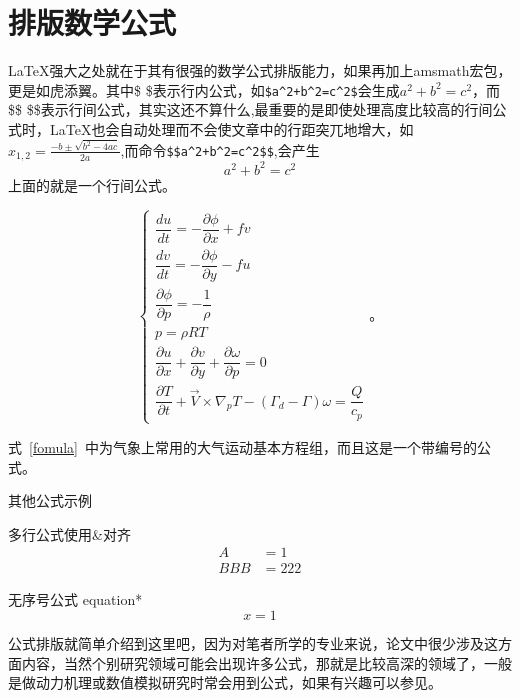 \section{排版数学公式}

\LaTeX 强大之处就在于其有很强的数学公式排版能力，如果再加上amsmath宏包，更是如虎添翼。其中\$  \$表示行内公式，如\verb|$a^2+b^2=c^2$|会生成$a^2+b^2=c^2$，而\$\$  \$\$表示行间公式，其实这还不算什么,最重要的是即使处理高度比较高的行间公式时，\LaTeX 也会自动处理而不会使文章中的行距突兀地增大，如$x_{1,2}= \frac{-b\pm \sqrt{b^2-4ac}}{2a}$,而命令\verb|$$a^2+b^2=c^2$$|,会产生$$a^2+b^2=c^2$$
上面的就是一个行间公式。

\begin{equation}\label{fomula}
    \begin{cases}
        \dfrac{du}{dt}=-\dfrac{\partial \phi}{\partial x}+fv \\[1.5ex]
        \dfrac{dv}{dt}=-\dfrac{\partial \phi}{\partial y}-fu \\[1.5ex]
        \dfrac{\partial \phi}{\partial p}=-\dfrac{1}{\rho}   \\[1.5ex]
        p= \rho RT                                           \\[1.5ex]
        \dfrac{\partial u}{\partial x}+\dfrac{\partial v}{\partial y}+
        \dfrac{\partial \omega}{\partial p}=0                \\[1.5ex]
        \dfrac{\partial T}{\partial t}+\overrightarrow{V}\times \nabla_pT-(\Gamma_d-\Gamma)\omega=\dfrac{Q}{c_p}
    \end{cases}
    \text{。}
\end{equation}

式~\ref{fomula}~中为气象上常用的大气运动基本方程组，而且这是一个带编号的公式。

其他公式示例

多行公式使用\&对齐
\begin{equation}
    \begin{aligned}
        A   & =1   \\
        BBB & =222
    \end{aligned}
\end{equation}

无序号公式 equation*
\begin{equation*}
    x=1
\end{equation*}

公式排版就简单介绍到这里吧，因为对笔者所学的专业来说，论文中很少涉及这方面内容，当然个别研究领域可能会出现许多公式，那就是比较高深的领域了，一般是做动力机理或数值模拟研究时常会用到公式，如果有兴趣可以参见\cite{x1}。

